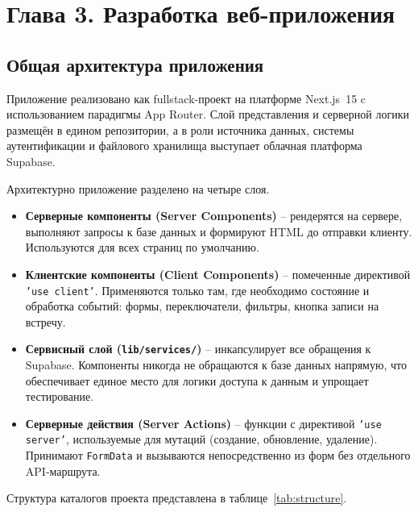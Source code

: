 \section*{Глава 3. Разработка веб-приложения}

\subsection{Общая архитектура приложения}

Приложение реализовано как fullstack-проект на платформе Next.js~15 c использованием
парадигмы App Router. Слой представления и серверной логики размещён в едином
репозитории, а в роли источника данных, системы аутентификации и файлового
хранилища выступает облачная платформа Supabase.

Архитектурно приложение разделено на четыре слоя.

\begin{itemize}
    \item \textbf{Серверные компоненты (Server Components)} -- рендерятся
          на сервере, выполняют запросы к базе данных и формируют HTML
          до отправки клиенту. Используются для всех страниц по умолчанию.
    \item \textbf{Клиентские компоненты (Client Components)} -- помеченные
          директивой \texttt{'use client'}. Применяются только там, где
          необходимо состояние и обработка событий: формы, переключатели,
          фильтры, кнопка записи на встречу.
    \item \textbf{Сервисный слой (\texttt{lib/services/})} -- инкапсулирует
          все обращения к Supabase. Компоненты никогда не обращаются к
          базе данных напрямую, что обеспечивает единое место для логики
          доступа к данным и упрощает тестирование.
    \item \textbf{Серверные действия (Server Actions)} -- функции с
          директивой \texttt{'use server'}, используемые для мутаций
          (создание, обновление, удаление). Принимают \texttt{FormData}
          и вызываются непосредственно из форм без отдельного API-маршрута.
\end{itemize}

Структура каталогов проекта представлена в таблице~\ref{tab:structure}.

